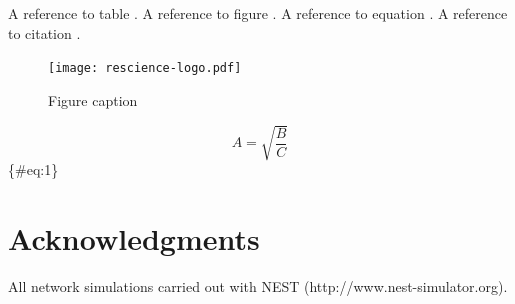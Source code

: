 \documentclass[10pt,a4paper,onecolumn]{article}
\begin{document}
A reference to table \textcite{tbl:table}. A reference to figure
\textcite{fig:logo}. A reference to equation \textcite{eq:1}. A
reference to citation \textcite{markdown}.

\begin{figure}
\centering
\texttt{[image: rescience-logo.pdf]}
\caption{Figure caption}\label{fig:logo}
\end{figure}

\[ A = \sqrt{\frac{B}{C}} \] \{\#eq:1\}

\section{Acknowledgments}\label{acknowledgments}

All network simulations carried out with NEST
(http://www.nest-simulator.org).

{\sffamily \small
  \printbibliography[title=References]
}
\end{document}
